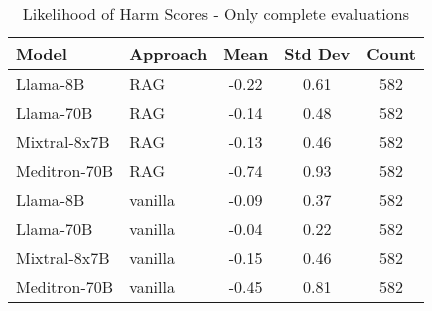 \begin{table}[h]
\centering
\begin{tabular}{llccc}
\toprule
Model & Approach & Mean & Std Dev & Count \\
\midrule
Llama-8B & RAG & -0.22 & 0.61 & 582 \\
Llama-70B & RAG & -0.14 & 0.48 & 582 \\
Mixtral-8x7B & RAG & -0.13 & 0.46 & 582 \\
Meditron-70B & RAG & -0.74 & 0.93 & 582 \\
Llama-8B & vanilla & -0.09 & 0.37 & 582 \\
Llama-70B & vanilla & -0.04 & 0.22 & 582 \\
Mixtral-8x7B & vanilla & -0.15 & 0.46 & 582 \\
Meditron-70B & vanilla & -0.45 & 0.81 & 582 \\
\bottomrule
\end{tabular}
\caption{Likelihood of Harm Scores - Only complete evaluations}
\label{tab:likelihood_of_harm_complete}
\end{table}